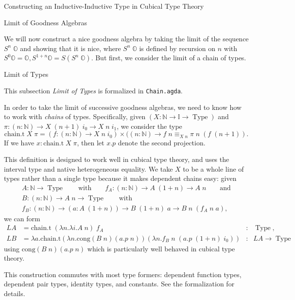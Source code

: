 \documentclass[runningheads]{llncs}
\DeclareMathOperator{\USet}{Type}
\newcommand{\IdA}[3]{{#1}\equiv_{#3}{#2}}
\newcommand{\N}{\mathbb{N}}
\newcommand{\II}{\mathbb{I}}
\newcommand{\bbO}{\mathbb{O}}
\begin{document}
\begin{section}{Constructing an Inductive-Inductive Type in Cubical Type Theory}
\begin{subsection}{Limit of Goodness Algebras}\label{ex-limit-alg}

We will now construct a nice goodness algebra by taking the limit of the sequence $S^n\;\bbO$ and showing that it is nice, where $S^n\;\bbO$ is defined by recursion on $n$ with $S^0\bbO = \bbO, S^{1+n}\bbO = S(S^n\;\bbO)$. But first, we consider the limit of a chain of types.

\begin{subsubsection}{Limit of Types}
    
    This subsection \emph{Limit of Types} is formalized in \texttt{Chain.agda}.
    
    In order to take the limit of successive goodness algebras, we need to know how to work with \emph{chains} of types. Specifically, given $(X : \N \to \II \to \USet)$ and $\pi : (n : \N) \to X\;(n+1)\;i_0 \to X\;n\;i_1$, we consider the type \[\text{chain.t}\;X\;\pi = (f : (n : \N) \to X\;n\;i_0)\times((n : \N) \to \IdA{f\;n}{\pi\;n\;(f\;(n+1))}{X\;n}.\] If we have $x : \text{chain.t}\;X\;\pi$, then let $x.p$ denote the second projection. 
    
    This definition is designed to work well in cubical type theory, and uses the interval type and native heterogeneous equality. We take $X$ to be a whole line of types rather than a single type because it makes dependent chains easy: given
    \begin{gather*}A : \N\to \USet\qquad\text{with}\qquad f_A : (n : \N) \to A\;(1+n) \to A\;n\qquad \text{and}\\B : (n : \N) \to A\;n \to \USet\qquad\text{with}\\f_B : (n : \N) \to (a : A\;(1+n)) \to B\;(1+n)\;a \to B\;n\;(f_A\;n\;a),\end{gather*}
    we can form
    \begin{align*}
    \mathit{LA} &= \text{chain.t}\;(\lambda n.\lambda i. A\;n)\;f_A &:& \USet,\\
    \mathit{LB} &= \lambda a.\text{chain.t}(\lambda n.\text{cong}(B\;n)(a.p\;n))(\lambda n. f_B\;n\;(a.p\;(1+n)\;i_0)) &:& \mathit{LA} \to \USet
    \end{align*}
    using $\text{cong}(B\;n)(a.p\;n)$ which is particularly well behaved in cubical type theory.
    
    This construction commutes with most type formers: dependent function types, dependent pair types, identity types, and constants. See the formalization for details.
    

\end{subsubsection}
\end{subsection}
\end{section}
\end{document}
